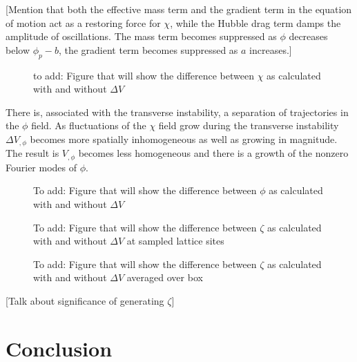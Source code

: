 \documentclass[letterpaper,11pt]{article}
\begin{document}
[Mention that both the effective mass term and the gradient term in the equation of motion act as a restoring force for $\chi$, while the Hubble drag term damps the amplitude of oscillations. The mass term becomes suppressed as $\phi$ decreases below $\phi_p-b$, the gradient term becomes suppressed as $a$ increases.]

\begin{figure}
\begin{center}
\caption{to add: Figure that will show the difference between $\chi$ as calculated with and without $\Delta V$}
\label{chi dif plot}
\end{center}
\end{figure}


There is, associated with the transverse instability, a separation of trajectories in the $\phi$ field. As fluctuations of the $\chi$ field grow during the transverse instability $\Delta V_{,\phi}$ becomes more spatially inhomogeneous as well as growing in magnitude. The result is $V_{,\phi}$ becomes less homogeneous and there is a growth of the nonzero Fourier modes of $\phi$.

\begin{figure}
\begin{center}
\caption{To add: Figure that will show the difference between $\phi$ as calculated with and without $\Delta V$}
\label{phi dif plot}
\end{center}
\end{figure}

\begin{figure}
\begin{center}
\caption{To add: Figure that will show the difference between $\zeta$ as calculated with and without $\Delta V$ at sampled lattice sites}
\label{zeta dif plot}
\end{center}
\end{figure}

\begin{figure}
\begin{center}
\caption{To add: Figure that will show the difference between $\zeta$ as calculated with and without $\Delta V$ averaged over box}
\label{zeta mean plot}
\end{center}
\end{figure}

[Talk about significance of generating $\zeta$]

\section{Conclusion}
\end{document}
